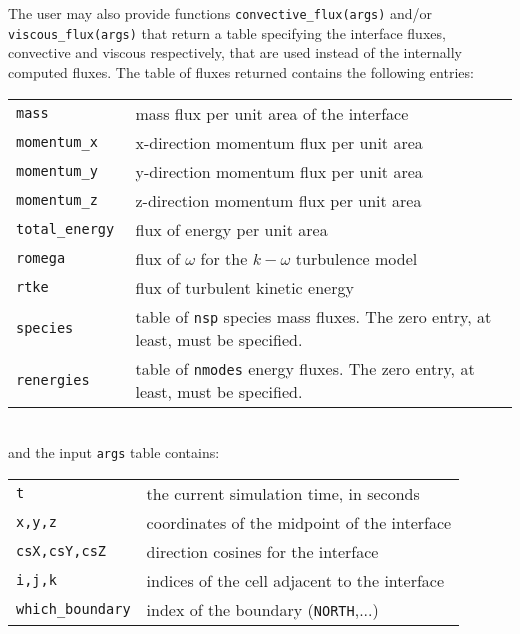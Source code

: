 \medskip
The user may also provide functions \texttt{convective\_flux(args)} and/or
\texttt{viscous\_flux(args)} that return a table specifying the interface fluxes,
convective and viscous respectively, that are used instead of the internally computed fluxes.
The table of fluxes returned contains the following entries:\\
\begin{tabular}{ll}
 \texttt{mass} &  mass flux per unit area of the interface \\
 \texttt{momentum\_x} & x-direction momentum flux per unit area \\
 \texttt{momentum\_y} & y-direction momentum flux per unit area \\
 \texttt{momentum\_z} & z-direction momentum flux per unit area \\
 \texttt{total\_energy } & flux of energy per unit area \\
 \texttt{romega} & flux of $\omega$ for the $k-\omega$ turbulence model \\
 \texttt{rtke} & flux of turbulent kinetic energy \\
 \texttt{species} & \parbox{12cm}{table of \texttt{nsp} species mass fluxes. The zero entry, at least, must be specified.} \\
 \texttt{renergies} & \parbox{12cm}{table of \texttt{nmodes} energy fluxes. The zero entry, at least, must be specified.} \\
\end{tabular}\\
and the input \texttt{args} table contains:\\
\begin{tabular}{ll}
 \texttt{t} &  the current simulation time, in seconds \\
 \texttt{x,y,z} &  coordinates of the midpoint of the interface\\
 \texttt{csX,csY,csZ} &  direction cosines for the interface\\
 \texttt{i,j,k} &  indices of the cell adjacent to the interface\\
 \texttt{which\_boundary} & index of the boundary (\texttt{NORTH},...) \\
\end{tabular}

